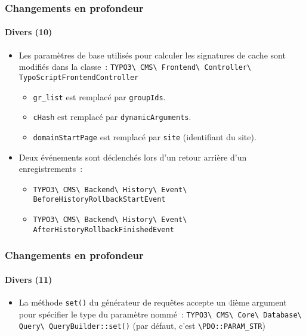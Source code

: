 \begin{frame}[fragile]
	\frametitle{Changements en profondeur}
	\framesubtitle{Divers (10)}

	\begin{itemize}
		\item Les paramètres de base utilisés pour calculer les signatures de cache sont
			modifiés dans la classe~:\newline
			\small
				\texttt{TYPO3\textbackslash
					CMS\textbackslash
					Frontend\textbackslash
					Controller\textbackslash
					TypoScriptFrontendController}
			\normalsize

			\begin{itemize}
				\item \texttt{gr\_list} est remplacé par \texttt{groupIds}.
				\item \texttt{cHash} est remplacé par \texttt{dynamicArguments}.
				\item \texttt{domainStartPage} est remplacé par \texttt{site} (identifiant du site).
			\end{itemize}

		\item Deux événements sont déclenchés lors d'un retour arrière d'un enregistrements~:

			\begin{itemize}\smaller
				\item \texttt{TYPO3\textbackslash
					CMS\textbackslash
					Backend\textbackslash
					History\textbackslash
					Event\textbackslash
					BeforeHistoryRollbackStartEvent}
				\item \texttt{TYPO3\textbackslash
					CMS\textbackslash
					Backend\textbackslash
					History\textbackslash
					Event\textbackslash
					AfterHistoryRollbackFinishedEvent}
			\end{itemize}\normalsize

	\end{itemize}

\end{frame}


\begin{frame}[fragile]
	\frametitle{Changements en profondeur}
	\framesubtitle{Divers (11)}

	\begin{itemize}
		\item La méthode \texttt{set()} du générateur de requêtes accepte un 4ième argument
			pour spécifier le type du paramètre nommé~:\newline
			\small
				\texttt{TYPO3\textbackslash
					CMS\textbackslash
					Core\textbackslash
					Database\textbackslash
					Query\textbackslash
					QueryBuilder::set()}
			\normalsize\newline
			\vspace{0.2cm}
			(par défaut, c'est \texttt{\textbackslash PDO::PARAM\_STR})

	\end{itemize}

\end{frame}

